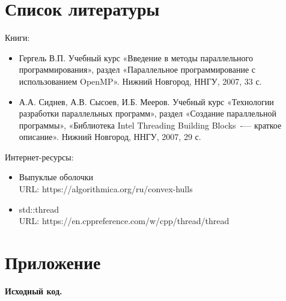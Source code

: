 \documentclass{report}
\begin{document}
\newpage

\section{Список литературы}
Книги:

\begin{itemize}
\item Гергель В.П. Учебный курс «Введение в методы параллельного программирования», раздел «Параллельное программирование с использованием OpenMP». Нижний Новгород, ННГУ, 2007, 33 с.
\item А.А. Сиднев, А.В. Сысоев, И.Б. Мееров. Учебный курс «Технологии разработки параллельных программ», раздел «Создание параллельной программы», «Библиотека Intel Threading Building Blocks~-— краткое описание». Нижний Новгород, ННГУ, 2007, 29 с.
\end{itemize}

\par Интернет-ресурсы:

\begin{itemize}
\item Выпуклые оболочки \\ URL: https://algorithmica.org/ru/convex-hulls
\item std::thread \\ URL: https://en.cppreference.com/w/cpp/thread/thread
\end{itemize}

\newpage

\section{Приложение}
\centerline{\bfseries Исходный код.} 












\end{document}
